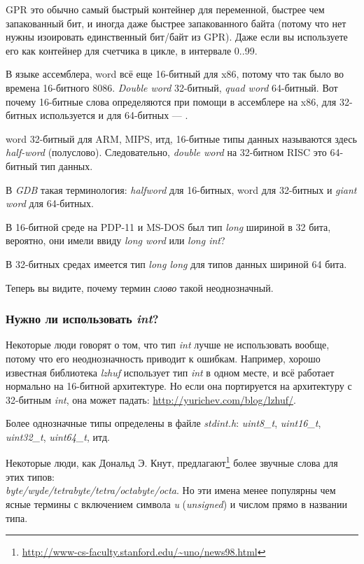 \myhrule{}

\ac{GPR} это обычно самый быстрый контейнер для переменной, быстрее чем запакованный бит, и иногда даже быстрее запакованного
байта (потому что нет нужны изоировать единственный бит/байт из \ac{GPR}).
Даже если вы используете его как контейнер для счетчика в цикле, в интервале 0..99.

\myhrule{}

В языке ассемблера, \gls{word} всё еще 16-битный для x86, потому что так было во времена 16-битного 8086.
\emph{Double word} 32-битный, \emph{quad word} 64-битный.
Вот почему 16-битные слова определяются при помощи  в ассемблере на x86, для 32-битных используется 
и для 64-битных --- .

\Gls{word} 32-битный для ARM, MIPS, итд, 16-битные типы данных называются здесь \emph{half-word} (полуслово).
Следовательно, \emph{double word} на 32-битном RISC это 64-битный тип данных.

В \emph{GDB} такая терминология: \emph{halfword} для 16-битных, \gls{word} для 32-битных и \emph{giant word} для 64-битных.

В 16-битной среде \CCpp{} на PDP-11 и MS-DOS был тип \emph{long} шириной в 32 бита, вероятно, они имели ввиду
\emph{long word} или \emph{long int}?

В 32-битных средах \CCpp{} имеется тип \emph{long long} для типов данных шириной 64 бита.

Теперь вы видите, почему термин \emph{слово} такой неоднозначный.

\subsubsection{Нужно ли использовать \emph{int}?}

Некоторые люди говорят о том, что тип \emph{int} лучше не использовать вообще, потому что его неоднозначность приводит
к ошибкам.
Например, хорошо известная библиотека \emph{lzhuf} использует тип \emph{int} в одном месте, и всё работает нормально на 16-битной
архитектуре.
Но если она портируется на архитектуру с 32-битным \emph{int}, она может падать: \url{http://yurichev.com/blog/lzhuf/}.

Более однозначные типы определены в файле \emph{stdint.h}:
\emph{uint8\_t}, \emph{uint16\_t}, \emph{uint32\_t}, \emph{uint64\_t}, итд.

Некоторые люди, как Дональд Э. Кнут, предлагают\footnote{\url{http://www-cs-faculty.stanford.edu/~uno/news98.html}}
более звучные слова для этих типов:\\
\emph{byte/wyde/tetrabyte/tetra/octabyte/octa}.
Но эти имена менее популярны чем ясные термины с включением символа \emph{u} (\emph{unsigned})
и числом прямо в названии типа.

